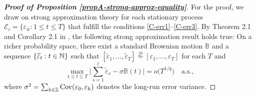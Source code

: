 \documentclass[a4paper,12pt]{article}
\begin{document}
\begin{proof}[\textnormal{\textbf{Proof of Proposition \ref{propA-strong-approx-equality}}}] 
For the proof, we draw on strong approximation theory for each stationary process $\mathcal{E}_i = \{\varepsilon_{it}: 1 \leq t \leq T\}$ that fulfill the conditions \ref{C-err1}--\ref{C-err3}. By Theorem 2.1 and Corollary 2.1 in \cite{BerkesLiuWu2014}, the following strong approximation result holds true: On a richer probability space, there exist a standard Brownian motion $\mathbb{B}$ and a sequence $\{ \widetilde{\varepsilon}_{t}: t \in \mathbb{N} \}$ such that $[\widetilde{\varepsilon}_{1},\ldots,\widetilde{\varepsilon}_{T}] \stackrel{\mathcal{D}}{=} [\varepsilon_{1},\ldots,\varepsilon_{T}]$ for each $T$ and 
\begin{equation}\label{eq-strongapprox-dep}
\max_{1 \le t \le T} \Big| \sum\limits_{s=1}^t \widetilde{\varepsilon}_{s} - \sigma \mathbb{B}(t) \Big| = o\big( T^{1/q} \big) \quad \text{a.s.},  
\end{equation}
where $\sigma^2 = \sum_{k \in \mathbb{Z}} \textnormal{Cov}(\varepsilon_{0}, \varepsilon_{k})$ denotes the long-run error variance.


\end{proof}
\end{document}
